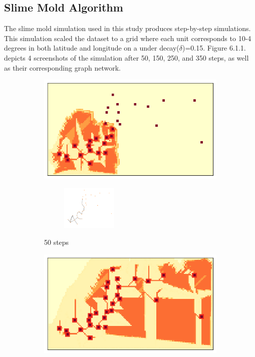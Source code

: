 \documentclass[11pt]{article}
\begin{document}
\subsection{Slime Mold Algorithm}
The slime mold simulation used in this study produces step-by-step simulations. This simulation scaled the dataset to a grid where each unit corresponds to 10-4 degrees in both latitude and longitude on a under decay($\delta$)=0.15. Figure 6.1.1. depicts 4 screenshots of the simulation after 50, 150, 250, and 350 steps, as well as their corresponding graph network. 
\begin{figure}[H]
    \centering
    \begin{subfigure}{0.24\textwidth}
        \centering
        \includegraphics[width=\linewidth]{50steps.png}
	\begin{subfigure}{0.24\textwidth}
	    \centering
	    \hspace*{-1cm}
	    \includegraphics[width=100px]{50graph.png}
	\end{subfigure}
        \caption{50 steps}
    \end{subfigure}\hfill
    \begin{subfigure}{0.24\textwidth}
        \centering
        \includegraphics[width=\linewidth]{150steps.png}

\end{subfigure}
\end{figure}
\end{document}
